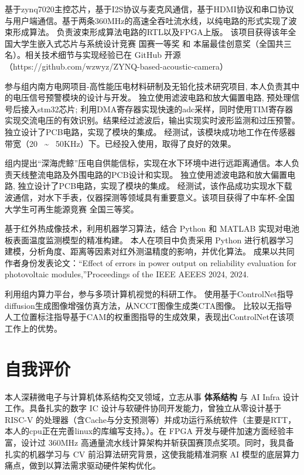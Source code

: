 \documentclass{resume}
\begin{document}
\Content
{基于zynq7020主控芯片，基于I2S协议与麦克风通信，基于HDMI协议和串口协议与用户端通信。基于两条360MHz的高速全吞吐流水线，以纯电路的形式实现了波束形成算法。}
{负责波束形成算法电路的RTL以及FPGA上版。}
{该项目获得该年全国大学生嵌入式芯片与系统设计竞赛 国赛一等奖 和 本届最佳创意奖（全国共三名）。相关技术细节与实现经验已在 GitHub 开源（https://github.com/wzwyz/ZYNQ-based-acoustic-camera）}

\Content
{参与组内南方电网项目-高性能压电材料研制及无铅化技术研究项目, 本人负责其中的电压信号预警模块的设计与开发。}
{独立使用滤波电路和放大偏置电路, 预处理信号后接入stm32芯片; 利用DMA寄存器实现快速的adc采样，同时使用TIM寄存器实现交流电压的有效识别。结果经过滤波后，输出实现实时波形监测和过压预警。独立设计了PCB电路，实现了模块的集成。}
{经测试，该模块成功地工作在传感器带宽（20~ \~ ~50KHz）下。已经投入使用，取得了良好的效果。}

\Content
{组内提出“深海虎鲸”压电自供能信标，实现在水下环境中进行远距离通信。本人负责天线整流电路及外围电路的PCB设计和实现。}
{独立使用滤波电路和放大偏置电路, 独立设计了PCB电路，实现了模块的集成。}
{经测试，该作品成功实现水下载波通信，对水下手表，仪器探测等领域具有重要意义。该项目获得了中车杯-全国大学生可再生能源竞赛 全国三等奖。}

\Content
{基于红外热成像技术，利用机器学习算法，结合 Python 和 MATLAB 实现对电池板表面温度监测模型的精准构建。}
{本人在项目中负责采用 Python 进行机器学习建模，分析角度、距离等因素对红外测温精度的影响，并优化算法。}
{成果以共同作者身份发表论文：“Effect of errors in power output on reliability evaluation for photovoltaic modules,”Proceedings of the IEEE AEEES 2024, 2024.}

\Content
{利用组内算力平台，参与多项计算机视觉的科研工作。}
{使用基于ControlNet指导diffusion生成图像增强仿真方法，从NCCT图像生成类CTA图像。}
{比较以无指导\/人工位置标注指导\/基于CAM的权重图指导的生成效果，表现出ControlNet在该项工作上的优势。}





\section{自我评价}
    \hspace*{2em} 本人深耕微电子与计算机体系结构交叉领域，立志从事 \textbf{体系结构} 与 AI Infra 设计工作。具备扎实的数字 IC 设计与软硬件协同开发能力，曾独立从零设计基于 RISC-V 的处理器（含Cache与分支预测等）并成功运行系统软件（主要是RTT，本人的cpu正在完善linux的库编写支持。）。在 FPGA 开发与硬件加速方面经验丰富，设计过 360MHz 高通量流水线计算架构并斩获国赛顶点奖项。同时，我具备扎实的机器学习与 CV 前沿算法研究背景，这使我能精准洞察 AI 模型的底层算力痛点，做到以算法需求驱动硬件架构优化。
\end{document}
